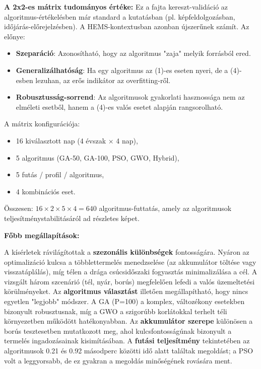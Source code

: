 \textbf{A 2x2-es mátrix tudományos értéke:}
Ez a fajta kereszt-validáció az algoritmus-értékelésben már standard a kutatásban (pl. képfeldolgozásban, időjárás-előrejelzésben). A HEMS-kontextusban azonban újszerűnek számít. Az előnye:
\begin{itemize}
	\item \textbf{Szeparáció}: Azonosítható, hogy az algoritmus "zaja" melyik forrásból ered.
	\item \textbf{Generalizálhatóság}: Ha egy algoritmus az (1)-es eseten nyeri, de a (4)-esben lezuhan, az erős indikátor az overfitting-ről.
	\item \textbf{Robusztusság-sorrend}: Az algoritmusok gyakorlati hasznossága nem az elméleti esetből, hanem a (4)-es valós esetet alapján rangsorolható.
\end{itemize}

A mátrix konfigurációja:
\begin{itemize}
	\item 16 kiválasztott nap (4 évszak × 4 nap),
	\item 5 algoritmus (GA-50, GA-100, PSO, GWO, Hybrid),
	\item 5 futás / profil / algoritmus,
	\item 4 kombinációs eset.
\end{itemize}

Összesen: \(16 \times 2 \times 5 \times 4 = 640\) algoritmus-futtatás, amely az algoritmusok teljesítménystabilitásáról ad részletes képet.

\textbf{Főbb megállapítások:}

A kísérletek rávilágítottak a \textbf{szezonális különbségek} fontosságára. Nyáron az optimalizáció kulcsa a többlettermelés menedzselése (az akkumulátor töltése vagy visszatáplálás), míg télen a drága csúcsidőszaki fogyasztás minimalizálása a cél. A vizsgált három szcenárió (tél, nyár, borús) megfelelően lefedi a valós üzemeltetési körülményeket. Az \textbf{algoritmus választást} illetően megállapítható, hogy nincs egyetlen "legjobb" módszer. A GA (P=100) a komplex, változékony esetekben bizonyult robusztusnak, míg a GWO a szigorúbb korlátokkal terhelt téli környezetben működött hatékonyabban. Az \textbf{akkumulátor szerepe} különösen a borús tesztesetben mutatkozott meg, ahol kulcsfontosságúnak bizonyult a termelés ingadozásainak kisimításában. A \textbf{futási teljesítmény} tekintetében az algoritmusok 0.21 és 0.92 másodperc közötti idő alatt találtak megoldást; a PSO volt a leggyorsabb, de ez gyakran a megoldás minőségének rovására ment.


